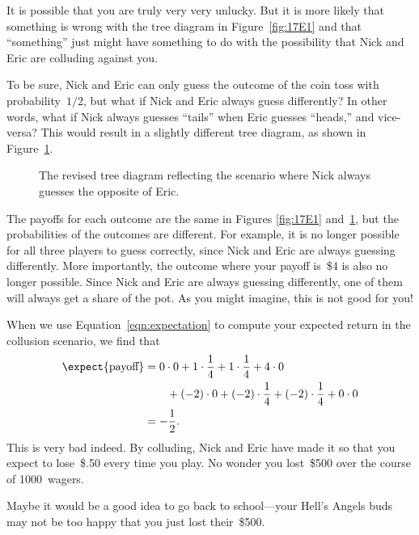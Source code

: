 It is possible that you are truly very very unlucky.  But it is more
likely that something is wrong with the tree diagram in
Figure~\ref{fig:17E1} and that ``something'' just might have
something to do with the possibility that Nick and Eric are colluding
against you.

To be sure, Nick and Eric can only guess the outcome of the coin toss
with probability~$1/2$, but what if Nick and Eric always guess
differently?  In other words, what if Nick always guesses ``tails''
when Eric guesses ``heads,'' and vice-versa?  This would result in a
slightly different tree diagram, as shown in Figure~\ref{fig:17E2}.

\begin{figure}


\caption{The revised tree diagram reflecting the scenario where Nick
  always guesses the opposite of Eric.}

\label{fig:17E2}

\end{figure}

The payoffs for each outcome are the same in Figures \ref{fig:17E1}
and~\ref{fig:17E2}, but the probabilities of the outcomes are
different.  For example, it is no longer possible for all three
players to guess correctly, since Nick and Eric are always guessing
differently.  More importantly, the outcome where your payoff is~\$4
is also no longer possible.  Since Nick and Eric are always guessing
differently, one of them will always get a share of the pot.  As you
might imagine, this is not good for you!

When we use Equation~\ref{eqn:expectation} to compute your expected
return in the collusion scenario, we find that
\begin{align*}
\expect{\text{payoff}}
    &= 0 \cdot 0 + 1 \cdot \frac{1}{4} + 1 \cdot \frac{1}{4}
        + 4 \cdot 0 \\
        & \qquad {}+ (-2) \cdot 0 + (-2) \cdot \frac{1}{4}
        + (-2) \cdot \frac{1}{4}
        + 0 \cdot 0 \\
    &= -\frac{1}{2}.
\end{align*}
This is very bad indeed.  By colluding, Nick and Eric have made it so
that you expect to lose~\$.50 every time you play.  No wonder you
lost~\$500 over the course of 1000~wagers.  

Maybe it would be a good idea to go back to school---your Hell's
Angels buds may not be too happy that you just lost their~\$500.

